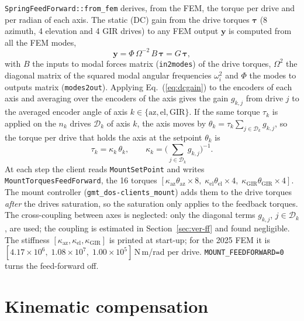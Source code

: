 \documentclass{gmto}
\numberwithin{table}{section}
\numberwithin{equation}{section}
\newcommand{\code}[1]{\texttt{#1}}
\newcommand{\vect}[1]{\boldsymbol{#1}}
\begin{document}
\code{SpringFeedForward::from\_fem} derives, from the FEM, the torque per drive and per radian of
each axis. The static (DC) gain from the drive torques $\vect{\tau}$ (8 azimuth, 4 elevation and 4 GIR
drives) to any FEM output $\vect{y}$ is computed from all the FEM modes,
\begin{equation}
  \vect{y} = \Phi\,\Omega^{-2}\,B\,\vect{\tau} = G\,\vect{\tau},
  \label{eq:dcgain}
\end{equation}
with $B$ the inputs to modal forces matrix (\code{in2modes}) of the drive torques, $\Omega^2$ the
diagonal matrix of the squared modal angular frequencies $\omega_i^2$ and $\Phi$ the modes to
outputs matrix (\code{modes2out}).
Applying Eq.~(\ref{eq:dcgain}) to the encoders of each axis and averaging over the encoders of the
axis gives the gain $g_{k,j}$ from drive $j$ to the averaged encoder angle of axis
$k \in \{\mathrm{az}, \mathrm{el}, \mathrm{GIR}\}$.
If the same torque $\tau_k$ is applied on the $n_k$ drives $\mathcal{D}_k$ of axis $k$,
the axis moves by $\theta_k = \tau_k\sum_{j\in\mathcal{D}_k} g_{k,j}$, so the torque per drive that
holds the axis at the setpoint $\theta_k$ is
\begin{equation}
  \tau_k = \kappa_k\,\theta_k, \qquad
  \kappa_k = \Big(\sum_{j\in\mathcal{D}_k} g_{k,j}\Big)^{-1}.
  \label{eq:stiffness}
\end{equation}
At each step the client reads \code{MountSetPoint} and writes \code{MountTorquesFeedForward},
the 16 torques $[\kappa_{\mathrm{az}}\theta_{\mathrm{az}}\times 8,\;
\kappa_{\mathrm{el}}\theta_{\mathrm{el}}\times 4,\; \kappa_{\mathrm{GIR}}\theta_{\mathrm{GIR}}\times 4]$.
The mount controller (\code{gmt\_dos-clients\_mount}) adds them to the drive torques
\emph{after} the drives saturation, so the saturation only applies to the feedback torques.
The cross-coupling between axes is neglected: only the diagonal terms $g_{k,j}$, $j\in\mathcal{D}_k$,
are used; the coupling is estimated in Section~\ref{sec:ver-ff} and found negligible. The stiffness $[\kappa_{\mathrm{az}}, \kappa_{\mathrm{el}}, \kappa_{\mathrm{GIR}}]$
is printed at start-up; for the 2025 FEM it is
$[4.17\times10^{6},\; 1.08\times10^{7},\; 1.00\times10^{5}]$\,N\,m/rad per drive. \code{MOUNT\_FEEDFORWARD=0}
turns the feed-forward off.

\section{Kinematic compensation}
\label{sec:kinematics}
\end{document}

